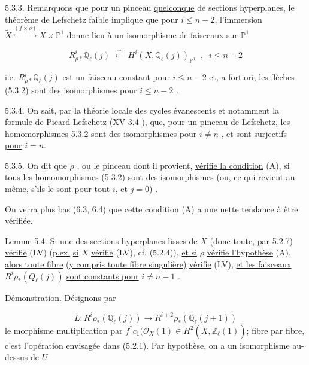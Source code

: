 5.3.3. Remarquons que pour un pinceau \underline{quelconque} de sections hyperplanes, le théorème de Lefschetz faible implique que pour $i \leq n-2$, l'immersion $\widetilde{X} \overset{(f\times\rho)}{\hookrightarrow} X\times\mathbb{P}^1$ donne lieu à un isomorphisme de faisceaux sur $\mathbb{P}^1$

\begin{equation*}
R^i_{\rho*}\mathbb{Q}_\ell(j) \; \xleftarrow{\ \sim\ } \; H^i(X,\mathbb{Q}_\ell(j))_{\mathbb{P}^1} \;\; , \;\; i \leq n-2
\end{equation*}


 i.e. $R^i_{\rho *}\mathbb{Q}_\ell(j)$ est un faisceau constant pour $i \leq n-2$ et, a fortiori, les flèches (5.3.2) sont des isomorphismes pour $i \leq n-2$ .

5.3.4. On sait, par la théorie locale des cycles évanescents et notamment la \underline{formule de Picard-Lefschetz} (XV 3.4 ), que, \underline{pour un pinceau de Lefschetz, les homomorphismes} 5.3.2 \underline{sont des isomorphismes pour} $i \neq n$ , \underline{et sont surjectifs pour} $i = n$.

5.3.5. On dit que $\rho$ , ou le pinceau dont il provient, \underline{vérifie la condition} (A), si \underline{tous} les homomorphismes (5.3.2) sont des isomorphismes (ou, ce qui revient au même, s'ils le sont pour tout $i$, et $j = 0$) .

On verra plus bas (6.3, 6.4) que cette condition (A) a une nette tendance à être vérifiée.

\underline{Lemme} 5.4. \underline{Si une des sections hyperplanes lisses de} $X$ \underline{(donc toute, par} 5.2.7) \underline{vérifie} (LV) (\underline{p.ex.} \underline{si} $X$ \underline{vérifie} (LV), cf. (5.2.4)), \underline{et si} $\rho$ \underline{vérifie l'hypothèse} (A), \underline{alors toute fibre} (\underline{y compris toute fibre singulière)} \underline{vérifie} (LV), \underline{et les faisceaux} $R^i\rho_*(Q_\ell(j))$ \underline{sont constants pour} $i \neq n-1$ .

\underline{Démonstration.} Désignons par

\begin{equation*}
L : R^i\rho_*(\mathbb{Q}_\ell(j)) \longrightarrow R^{i+2}\rho_*(\mathbb{Q}_\ell(j+1))
\end{equation*}
le morphisme multiplication par $f^*c_1(\mathcal{O}_X(1) \in H^2(\widetilde{X},\mathbb{Z}_\ell(1))$; fibre par fibre, c'est l'opération envisagée dans (5.2.1). Par hypothèse, on a
un isomorphisme au-dessus de $U$

